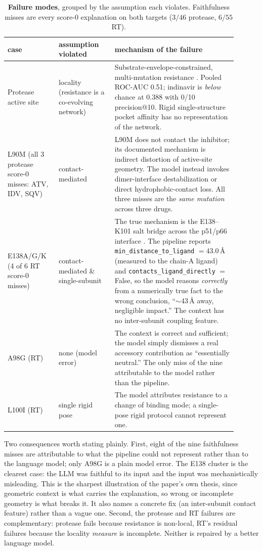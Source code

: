 \documentclass{article}
\begin{document}
\begin{table}[h]
\centering
\caption{\textbf{Failure modes}, grouped by the assumption each violates. Faithfulness misses are every score-0 explanation on both targets ($3/46$ protease, $6/55$ RT).}
\label{tab:failure}
\footnotesize
\begin{tabular}{p{0.20\linewidth}p{0.22\linewidth}p{0.48\linewidth}}
\toprule
case & assumption violated & mechanism of the failure \\
\midrule
Protease active site
& locality (resistance is a co-evolving network)
& Substrate-envelope-constrained, multi-mutation resistance \citep{king2004,nalam2010}. Pooled ROC-AUC 0.51; indinavir is \emph{below} chance at 0.388 with 0/10 precision@10. Rigid single-structure pocket affinity has no representation of the network. \\
\addlinespace
L90M (all 3 protease score-0 misses: ATV, IDV, SQV)
& contact-mediated
& L90M does not contact the inhibitor; its documented mechanism is indirect distortion of active-site geometry. The model instead invokes dimer-interface destabilization or direct hydrophobic-contact loss. All three misses are the \emph{same mutation} across three drugs. \\
\addlinespace
E138A/G/K (4 of 6 RT score-0 misses)
& contact-mediated \& single-subunit
& The true mechanism is the E138--K101 salt bridge across the p51/p66 interface \citep{das2013}. The pipeline reports \texttt{min\_distance\_to\_ligand} $=43.0$\,\AA{} (measured to the chain-A ligand) and \texttt{contacts\_ligand\_directly} $=$ False, so the model reasons \emph{correctly} from a numerically true fact to the wrong conclusion, ``$\sim$43\,\AA{} away, negligible impact.'' The context has no inter-subunit coupling feature. \\
\addlinespace
A98G (RT)
& none (model error)
& The context is correct and sufficient; the model simply dismisses a real accessory contribution as ``essentially neutral.'' The only miss of the nine attributable to the model rather than the pipeline. \\
\addlinespace
L100I (RT)
& single rigid pose
& The model attributes resistance to a change of binding mode; a single-pose rigid protocol cannot represent one. \\
\bottomrule
\end{tabular}
\end{table}

Two consequences worth stating plainly. First, eight of the nine faithfulness
misses are attributable to what the pipeline could not represent rather than to
the language model; only A98G is a plain model error. The E138 cluster is the
clearest case: the LLM was faithful to its input and the input was
mechanistically misleading. This is the sharpest illustration
of the paper's own thesis, since geometric context is what carries the explanation,
so wrong or incomplete geometry is what breaks it. It also names a concrete
fix (an inter-subunit contact feature) rather than a vague one. Second, the
protease and RT failures are complementary: protease fails because resistance is
non-local, RT's residual failures because the locality \emph{measure} is
incomplete. Neither is repaired by a better language model.
\end{document}
